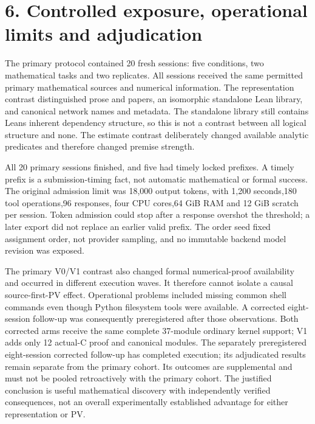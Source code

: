 \documentclass[11pt]{article}
\begin{document}
\begin{center}


\ifdim\wd\eqbox>\linewidth\resizebox{\linewidth}{!}{\usebox{\eqbox}}\else\usebox{\eqbox}\fi

\end{center}

\section{6. Controlled exposure, operational limits and adjudication}

The primary protocol contained 20 fresh sessions: five conditions, two mathematical tasks and two replicates. All sessions received the same permitted primary mathematical sources and numerical information. The representation contrast distinguished prose and papers, an isomorphic standalone Lean library, and canonical network names and metadata. The standalone library still contains Leans inherent dependency structure, so this is not a contrast between all logical structure and none. The estimate contrast deliberately changed available analytic predicates and therefore changed premise strength.


All 20 primary sessions finished, and five had timely locked prefixes. A timely prefix is a submission-timing fact, not automatic mathematical or formal success. The original admission limit was 18,000 output tokens, with 1,200 seconds,180 tool operations,96 responses, four CPU cores,64 GiB RAM and 12 GiB scratch per session. Token admission could stop after a response overshot the threshold; a later export did not replace an earlier valid prefix. The order seed fixed assignment order, not provider sampling, and no immutable backend model revision was exposed.


The primary V0/V1 contrast also changed formal numerical-proof availability and occurred in different execution waves. It therefore cannot isolate a causal source-first-PV effect. Operational problems included missing common shell commands even though Python filesystem tools were available. A corrected eight-session follow-up was consequently preregistered after those observations. Both corrected arms receive the same complete 37-module ordinary kernel support; V1 adds only 12 actual-C proof and canonical modules. The separately preregistered eight-session corrected follow-up has completed execution; its adjudicated results remain separate from the primary cohort. Its outcomes are supplemental and must not be pooled retroactively with the primary cohort. The justified conclusion is useful mathematical discovery with independently verified consequences, not an overall experimentally established advantage for either representation or PV.
\end{document}
